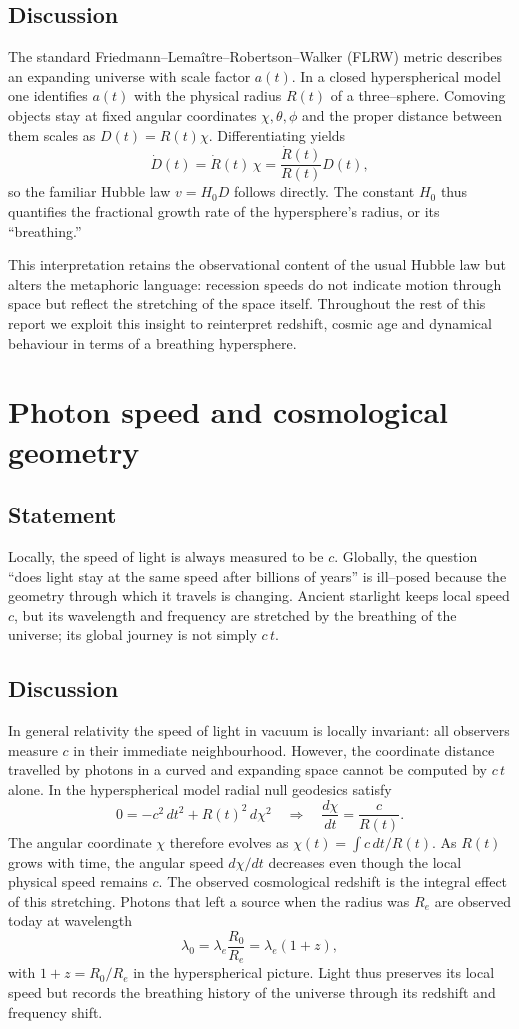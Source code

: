 \documentclass[12pt,a4paper]{article}
\begin{document}
\subsection{Discussion}
The standard Friedmann–Lemaître–Robertson–Walker (FLRW) metric describes an expanding universe with scale factor $a(t)$.  In a closed hyperspherical model one identifies $a(t)$ with the physical radius $R(t)$ of a three–sphere.  Comoving objects stay at fixed angular coordinates $\chi,\theta,\phi$ and the proper distance between them scales as $D(t) = R(t)\chi$.  Differentiating yields
\[\dot{D}(t) = \dot{R}(t)\,\chi = \frac{\dot{R}(t)}{R(t)} D(t),\]
so the familiar Hubble law $v=H_0D$ follows directly.  The constant $H_0$ thus quantifies the fractional growth rate of the hypersphere’s radius, or its ``breathing.''

This interpretation retains the observational content of the usual Hubble law but alters the metaphoric language: recession speeds do not indicate motion through space but reflect the stretching of the space itself.  Throughout the rest of this report we exploit this insight to reinterpret redshift, cosmic age and dynamical behaviour in terms of a breathing hypersphere.

\section{Photon speed and cosmological geometry}
\label{sec:speed}
\subsection{Statement}
Locally, the speed of light is always measured to be $c$.  Globally, the question ``does light stay at the same speed after billions of years'' is ill–posed because the geometry through which it travels is changing.  Ancient starlight keeps local speed $c$, but its wavelength and frequency are stretched by the breathing of the universe; its global journey is not simply $c\,t$.

\subsection{Discussion}
In general relativity the speed of light in vacuum is locally invariant: all observers measure $c$ in their immediate neighbourhood.  However, the coordinate distance travelled by photons in a curved and expanding space cannot be computed by $c\,t$ alone.  In the hyperspherical model radial null geodesics satisfy
\[
0 = -c^2\,dt^2 + R(t)^2\,d\chi^2 \quad \Rightarrow \quad \frac{d\chi}{dt} = \frac{c}{R(t)}.
\]
The angular coordinate $\chi$ therefore evolves as $\chi(t) = \int c\,dt/R(t)$.  As $R(t)$ grows with time, the angular speed $d\chi/dt$ decreases even though the local physical speed remains $c$.  The observed cosmological redshift is the integral effect of this stretching.  Photons that left a source when the radius was $R_e$ are observed today at wavelength
\[
\lambda_0 = \lambda_e \frac{R_0}{R_e} = \lambda_e (1+z),
\]
with $1+z=R_0/R_e$ in the hyperspherical picture.  Light thus preserves its local speed but records the breathing history of the universe through its redshift and frequency shift.
\end{document}
